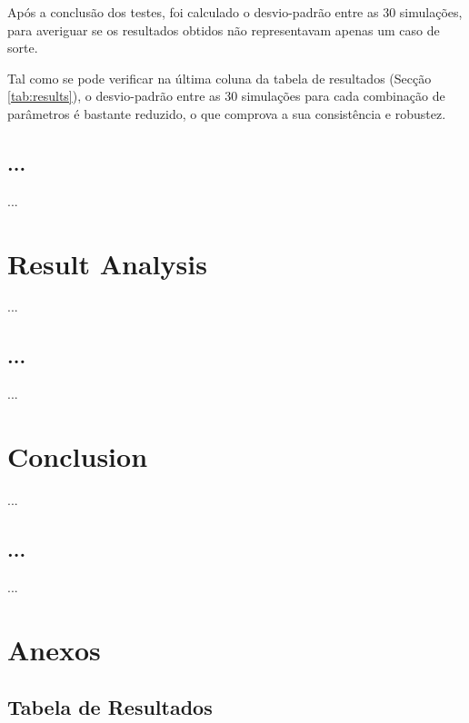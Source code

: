 \documentclass[a4paper]{article}
\begin{document}
Após a conclusão dos testes, foi calculado o desvio-padrão entre as 30 simulações,
para averiguar se os resultados obtidos não representavam apenas um caso de sorte.

Tal como se pode verificar na última coluna da tabela de resultados (Secção \ref{tab:results}), o desvio-padrão entre as 30 simulações para cada combinação de parâmetros
é bastante reduzido, o que comprova a sua consistência e robustez.

\cleardoublepage

\subsection{...}
\indent \indent ...

\cleardoublepage

\section{Result Analysis}
\indent \indent ...

\cleardoublepage

\subsection{...}
\indent \indent ...

\cleardoublepage
\section{Conclusion}
\indent \indent ...

\cleardoublepage

\subsection{...}
\indent \indent ...

\cleardoublepage
\section{Anexos}

\eject \pdfpagewidth=594.0mm \pdfpageheight=420.0mm

\subsection{Tabela de Resultados}
\begin{center}
	
\end{center}
\end{document}
